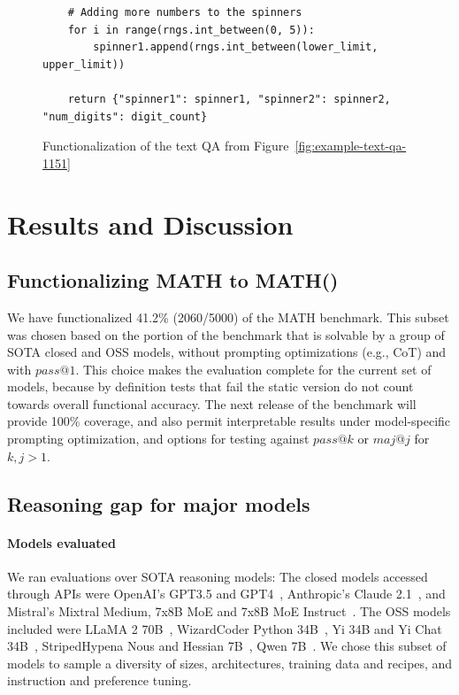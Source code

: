 \documentclass[11pt,a4paper]{article}
\begin{document}
\begin{figure}
\begin{verbatim}
    # Adding more numbers to the spinners
    for i in range(rngs.int_between(0, 5)):
        spinner1.append(rngs.int_between(lower_limit, upper_limit))

    return {"spinner1": spinner1, "spinner2": spinner2, "num_digits": digit_count}
\end{verbatim}
\caption{\label{fig:example-fn-qa-1151} Functionalization of the text QA from Figure~\ref{fig:example-text-qa-1151}}
\end{figure}

\section{Results and Discussion}

\subsection{Functionalizing MATH to MATH()}
\label{result:functional-math}
We have functionalized 41.2\% (2060/5000) of the MATH benchmark. This subset was chosen based on the
portion of the benchmark that is solvable by a group of SOTA closed and OSS
models, without prompting optimizations (e.g., CoT) and with $pass@1$. This
choice makes the evaluation complete for the current set of models, because by
definition tests that fail the static version do not count towards overall
functional accuracy. The next release of the benchmark will provide 100\%
coverage, and also permit interpretable results under model-specific prompting
optimization, and options for testing against $pass@k$ or $maj@j$ for $k,j>1$.

\subsection{Reasoning gap for major models}
\label{result:gap}

\paragraph{Models evaluated} We ran evaluations over SOTA reasoning models: The closed models accessed through APIs were OpenAI's GPT3.5 and GPT4~\cite{gpt4}, Anthropic's Claude 2.1~\cite{claude2.1}, and Mistral's Mixtral Medium, 7x8B MoE and 7x8B MoE Instruct~\cite{mixtral}. The OSS models included were LLaMA 2 70B~\cite{llama-2}, WizardCoder Python 34B~\cite{wizardcoder-34B}, Yi 34B and Yi Chat 34B~\cite{yi}, StripedHypena Nous and Hessian 7B~\cite{striped-hyena}, Qwen 7B~\cite{qwen}. We chose this subset of models to sample a diversity of sizes, architectures, training data and recipes, and instruction and preference tuning.
\end{document}
